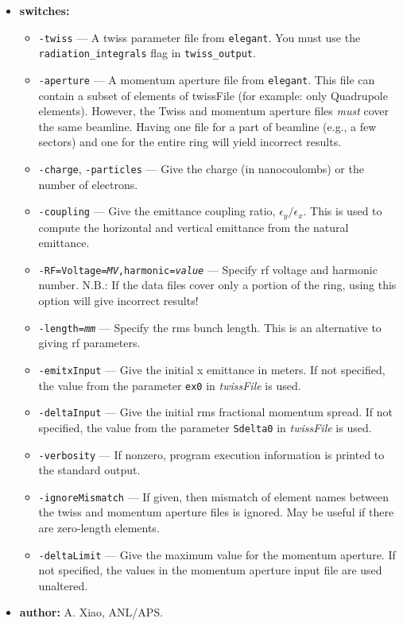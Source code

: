 \documentclass[11pt]{article}
\begin{document}
\begin{itemize}
\item {\bf switches:}
\begin{itemize}
\item {\tt -twiss} --- A twiss parameter file from {\tt elegant}. 
You must use the \verb|radiation_integrals| flag in \verb|twiss_output|.
\item {\tt -aperture} --- A momentum aperture file from {\tt elegant}.
This file can contain a subset of elements of twissFile (for example:
only Quadrupole elements).  However, the Twiss and momentum aperture
files {\em must} cover the same beamline. Having one file for a part
of beamline (e.g., a few sectors) and one for the entire ring will
yield incorrect results.
\item {\tt -charge}, {\tt -particles} --- Give the charge (in nanocoulombs) or the
 number of electrons.
\item {\tt -coupling} --- Give the emittance coupling ratio, $\epsilon_y/\epsilon_x$.  This is
 used to compute the horizontal and vertical emittance from the natural emittance.
\item {\tt -RF=Voltage={\em MV},harmonic={\em value}} --- Specify rf voltage and harmonic number.
 N.B.: If the data files cover only a portion of the ring, using this option will give incorrect results!
\item {\tt -length={\em mm}} --- Specify the rms bunch length.  This is an alternative to giving rf parameters.
\item {\tt -emitxInput} --- Give the initial x emittance in meters.  If not specified,
the value from the parameter \verb|ex0| in {\em twissFile} is used.
\item {\tt -deltaInput} --- Give the initial rms fractional momentum spread.  If not
specified, the value from the parameter \verb|Sdelta0| in {\em twissFile} is used.
\item {\tt -verbosity} --- If nonzero, program execution information is printed to the standard output.
\item {\tt -ignoreMismatch} --- If given, then mismatch of element names between the twiss and momentum
  aperture files is ignored.  May be useful if there are zero-length elements.
\item {\tt -deltaLimit} --- Give the maximum value for the momentum aperture.  If not specified,
  the values in the momentum aperture input file are used unaltered.
\end{itemize}

\item {\bf author:} A. Xiao, ANL/APS.

\end{itemize}
\end{document}
